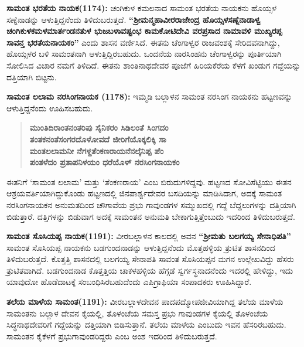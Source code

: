 \textbf{ಸಾಮಂತ ಭರತೆಯ ನಾಯಕ(1174):} ಚಂಗಿಕುಳ ಕಮಲನಾದ ಸಾಮಂತ ಭರತೆಯ ನಾಯಕನು ಹೊಯ್ಸಳ ಸಣ್ನೆನಾಡನ್ನು ಆಳುತ್ತಿದ್ದನೆಂದು ತಿಳಿದುಬರುತ್ತದೆ. \textbf{“ಶ‍್ರೀಮನ್ಮಹಾವೀರರಾಜೇಂದ್ರ ಹೊಯ್ಸಳಸಣ್ನೆನಾಡಾಳ್ವ ಚಂಗಿಕುಳಕಮಳಮಾರ್ತಂಡನತುಳ ಭುಜಬಳಾವಷ್ಟಂಭ ಕಾಮಕೋಟಿದೇವಿ ವರಪ್ರಸಾದ ನಾಮಾವಳಿ ಮುಖ್ಯರಪ್ಪ ಸಾವನ್ತ ಭರತೆಯನಾಯಕಂ”} ಎಂದು ಶಾಸನ ವರ್ಣಿಸಿದೆ. ಈತನು ಚೆಂಗಾಳ್ವರ ರಾಜವಂಶಕ್ಕೆ ಸೇರಿದವನಾಗಿದ್ದು, ಹೊಯ್ಸಳರ ಬಳಿ ಸಾಮಂತನಾಗಿ ಆಳುತ್ತಿದ್ದಿರಬಹುದು. ಒಂದನೆಯ ನಾರಸಿಂಹನು ಚೆಂಗಾಳ್ವರನ್ನು ಪೂರ್ತಿಯಾಗಿ ಸೋಲಿಸಿದ ವಿಚಾರ ನಮಗೆ ತಿಳಿದಿದೆ. ಈತನು ಶಾಂತಿನಾಥದೇವರ ಪೂಜೆಗೆ ಹಿರಿಯಕೆರೆಯ ಕೆಳಗೆ ಖಂಡುಗ ಗದ್ದೆಯನ್ನು ದತ್ತಿಯಾಗಿ ಬಿಟ್ಟನು.

\textbf{ಸಾಮಂತ ಲಲಾಮ ನರಸಿಂಗನಾಯಕ (1178):} ಇಮ್ಮಡಿ ಬಲ್ಲಾಳನ ಸಾಮಂತ ನರಸಿಂಗ ನಾಯಕನು ಹಟ್ಟಣವನ್ನು ಆಳುತ್ತಿದ್ದನೆಂದು ಊಹಿಸಬಹುದು.

\newpage

\begin{verse}
\textbf{ಮುಂತಿದಿರಾಂತನಂತರಿಪು ಸೈನಿಕರಂ ಸಿಡಿಲಂತೆ ಸಿಂಗದಂ} \\\textbf{ತಂತಕನಂತೆಸಂಗರದೊಳೋವದೆ ಜೀರಿಗೆಯೊಕ್ಕಲಿಕ್ಕಿ ಸಾ} \\\textbf{ಮಂತಲಲಾಮನೀ ನೆಗಳ್ದತೆಂಕಣರಾಯನೆನಲ್ಕೆನಿಪ್ಪ ಪೆಂ} \\\textbf{ಪಂತಳೆದಂ ಪ್ರತಾಪನಿಳಯಂ ಧರೆಯೊಳ್​ ನರಸಿಂಗನಾಯಕಂ}
\end{verse}

ಈತನಿಗೆ ‘ಸಾಮಂತ ಲಲಾಮ’ ಮತ್ತು ‘ತೆಂಕಣರಾಯ’ ಎಂಬ ಬಿರುದುಗಳಿದ್ದವು. ಹಟ್ಟಣದ ಸೋವಿಸೆಟ್ಟಿಯು ಈತನ ಆಶ್ರಯವರ್ತಿಯಾಗಿದ್ದುಕೊಂಡು ಹಟ್ಟಣದಲ್ಲಿ ಜಿನಪಾರ್ಶ್ವದೇವರ ಬಸದಿಯನ್ನು ಮಾಡಿಸಿದಾಗ, ಅದಕ್ಕೆ ಸಾಮಂತ ನರಸಿಂಗನಾಯಕನ ಅನುಮತದಿಂದ ಚೌಗಾವೆಯ ಪ್ರಭು ಗಾವುಂಡಗಳ ಸಮ್ಮುಖದಲ್ಲಿ ಗದ್ದೆ ಬೆದ್ದಲುಗಳನ್ನು ದತ್ತಿಯಾಗಿ ಬಿಡುತ್ತಾರೆ. ದತ್ತಿಗಳನ್ನು ಬಿಡುವಾಗ ಅದಕ್ಕೆ ಸಾಮಂತನ ಅನುಮತಿ ಬೇಕಾಗುತ್ತಿತ್ತೆಂಬುದು ಇದರಿಂದ ತಿಳಿದುಬರುತ್ತದೆ.

\textbf{ಸಾಮಂತ ಸೊಸಿಯಪ್ಪ ನಾಯಕ(1191):} ವೀರಬಲ್ಲಾಳನ ಕಾಲದಲ್ಲಿ ಅವನ \textbf{“ಶ‍್ರೀಮತು ಬಲಗಯ್ಯ ಸೇನಾಧಿಪತಿ”} ಸಾಮಂತ ಸೊಸಿಯಪ್ಪ ನಾಯಕನು ಬಡಗುಂದನಾಡನ್ನು ಆಳುತ್ತಿದ್ದನೆಂದು ಮೊತ್ತಹಳ್ಳಿಯ ತ್ರುಟಿತ ಶಾಸನದಿಂದ ತಿಳಿದು\-ಬರುತ್ತದೆ. ಕೊತ್ತತ್ತಿ ಶಾಸನದಲ್ಲಿ ಬಲಗಯ್ಯ ಸೇನಾಪತಿ ಸಾವಂತ ಸೊಸಿಯಪ್ಪನ ಮಗನ ಉಲ್ಲೇಖವಿದ್ದು ಹೆಸರು ತ್ರುಟಿತವಾಗಿದೆ. ಬಡಗುಂದನಾಡ ಕೊತ್ತತ್ತಿಯ ಚಾಕಳಹಳ್ಳಿಯ ಹೆಗ್ಗಡೆ ಸ್ವರ್ಗಸ್ಥನಾದನೆಂದು ಇದರಲ್ಲಿ ಹೇಳಿದ್ದು, ಇದು ಯಾವುದೋ ಹೊಡೆದಾಟಕ್ಕೆ ಸಂಬಂಧಿಸಿರಬಹುದೆಂದು ಎಪಿಗ್ರಾಫಿಯಾ ಸಂಪಾದಕರು ಊಹಿಸಿದ್ದಾರೆ.

\textbf{ತಲೆಯ ಮಾಳೆಯ ಸಾಮಂತ(1191):} ವೀರಬಲ್ಲಾಳದೇವನ ಪಾದಪದ್ಮೋಪಜೀವಿಯಾಗಿದ್ದ ತಲೆಯ ಮಾಳೆಯ ಸಾಮಂತನು ಬಲ್ಲಾಳ ದೇವನ ಕೈಯಲ್ಲಿ, ತೊಳಂಚೆಯ ಸಮಸ್ತ ಪ್ರಭು ಗಾವುಂಡಗಳ ಕೈಯಲ್ಲಿ ತೊಳಂಚೆಯ ಸಿದ್ಧನಾಥದೇವರಿಗೆ ಗದ್ದೆಯನ್ನು ದತ್ತಿಯಾಗಿ ಬಿಡಿಸುತ್ತಾನೆ. ತಲೆಯ ಮಾಳೆಯ ಎಂಬುದು ಇವನ ಹೆಸರಿರಬಹುದು. ಸಾಮಂತನ ಕೈಕೆಳಗೆ ಪ್ರಭುಗಾವುಂಡರಿದ್ದರು ಎಂಬ ಅಂಶ ಇದರಿಂದ ತಿಳಿದುಬರುತ್ತದೆ.

